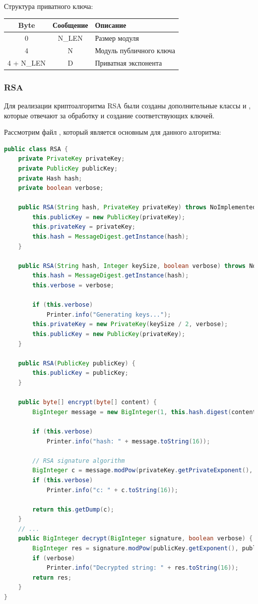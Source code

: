Структура приватного ключа:
\begin{table}[h!]
  \centering
  \begin{tabular}{|c|c|l|}
    \hline 
    Byte & Сообщение & Описание\\ \hline
    0 & N\_LEN & Размер модуля \\ \hline 
    4 & N & Модуль публичного ключа \\ \hline
    4 + N\_LEN & D & Приватная экспонента \\ \hline
  \end{tabular}
\end{table}

\subsubsection{RSA}

Для реализации криптоалгоритма RSA были созданы дополнительные классы  и , которые
отвечают за обработку и создание соответствующих ключей.

Рассмотрим файл , который является основным для данного алгоритма:
\begin{lstlisting}[language=Java]
public class RSA {
    private PrivateKey privateKey;
    private PublicKey publicKey;
    private Hash hash;
    private boolean verbose;

    public RSA(String hash, PrivateKey privateKey) throws NoImplementedAlgorithmException {
        this.publicKey = new PublicKey(privateKey);
        this.privateKey = privateKey;
        this.hash = MessageDigest.getInstance(hash);
    }

    public RSA(String hash, Integer keySize, boolean verbose) throws NoImplementedAlgorithmException {
        this.hash = MessageDigest.getInstance(hash);
        this.verbose = verbose;

        if (this.verbose)
            Printer.info("Generating keys...");
        this.privateKey = new PrivateKey(keySize / 2, verbose);
        this.publicKey = new PublicKey(privateKey);
    }

    public RSA(PublicKey publicKey) {
        this.publicKey = publicKey;
    }

    public byte[] encrypt(byte[] content) {
        BigInteger message = new BigInteger(1, this.hash.digest(content));

        if (this.verbose)
            Printer.info("hash: " + message.toString(16));

        // RSA signature algorithm
        BigInteger c = message.modPow(privateKey.getPrivateExponent(), privateKey.getModulo());
        if (this.verbose)
            Printer.info("c: " + c.toString(16));

        return this.getDump(c);
    }
    // ...
    public BigInteger decrypt(BigInteger signature, boolean verbose) {
        BigInteger res = signature.modPow(publicKey.getExponent(), publicKey.getModulo());
        if (verbose)
            Printer.info("Decrypted string: " + res.toString(16));
        return res;
    }
}
\end{lstlisting}

